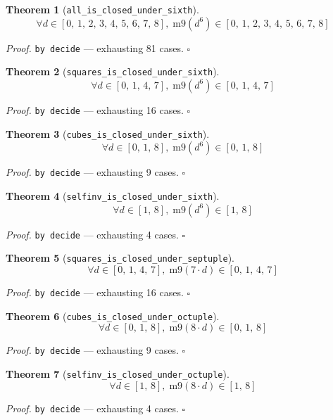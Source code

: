 \documentclass[11pt]{article}
\newtheorem{theorem}{Theorem}[section]
\begin{document}
\begin{theorem}[\texttt{all\_is\_closed\_under\_sixth}]
\[ \forall d \in [0,\,1,\,2,\,3,\,4,\,5,\,6,\,7,\,8],\; \mathrm{m9}\mathopen{}\left(d^{6}\right) \in [0,\,1,\,2,\,3,\,4,\,5,\,6,\,7,\,8] \]
\end{theorem}
\noindent\emph{Proof.} \texttt{by decide} --- exhausting 81 cases. \hfill$\square$

\begin{theorem}[\texttt{squares\_is\_closed\_under\_sixth}]
\[ \forall d \in [0,\,1,\,4,\,7],\; \mathrm{m9}\mathopen{}\left(d^{6}\right) \in [0,\,1,\,4,\,7] \]
\end{theorem}
\noindent\emph{Proof.} \texttt{by decide} --- exhausting 16 cases. \hfill$\square$

\begin{theorem}[\texttt{cubes\_is\_closed\_under\_sixth}]
\[ \forall d \in [0,\,1,\,8],\; \mathrm{m9}\mathopen{}\left(d^{6}\right) \in [0,\,1,\,8] \]
\end{theorem}
\noindent\emph{Proof.} \texttt{by decide} --- exhausting 9 cases. \hfill$\square$

\begin{theorem}[\texttt{selfinv\_is\_closed\_under\_sixth}]
\[ \forall d \in [1,\,8],\; \mathrm{m9}\mathopen{}\left(d^{6}\right) \in [1,\,8] \]
\end{theorem}
\noindent\emph{Proof.} \texttt{by decide} --- exhausting 4 cases. \hfill$\square$

\begin{theorem}[\texttt{squares\_is\_closed\_under\_septuple}]
\[ \forall d \in [0,\,1,\,4,\,7],\; \mathrm{m9}\mathopen{}\left(7 \cdot d\right) \in [0,\,1,\,4,\,7] \]
\end{theorem}
\noindent\emph{Proof.} \texttt{by decide} --- exhausting 16 cases. \hfill$\square$

\begin{theorem}[\texttt{cubes\_is\_closed\_under\_octuple}]
\[ \forall d \in [0,\,1,\,8],\; \mathrm{m9}\mathopen{}\left(8 \cdot d\right) \in [0,\,1,\,8] \]
\end{theorem}
\noindent\emph{Proof.} \texttt{by decide} --- exhausting 9 cases. \hfill$\square$

\begin{theorem}[\texttt{selfinv\_is\_closed\_under\_octuple}]
\[ \forall d \in [1,\,8],\; \mathrm{m9}\mathopen{}\left(8 \cdot d\right) \in [1,\,8] \]
\end{theorem}
\noindent\emph{Proof.} \texttt{by decide} --- exhausting 4 cases. \hfill$\square$
\end{document}
